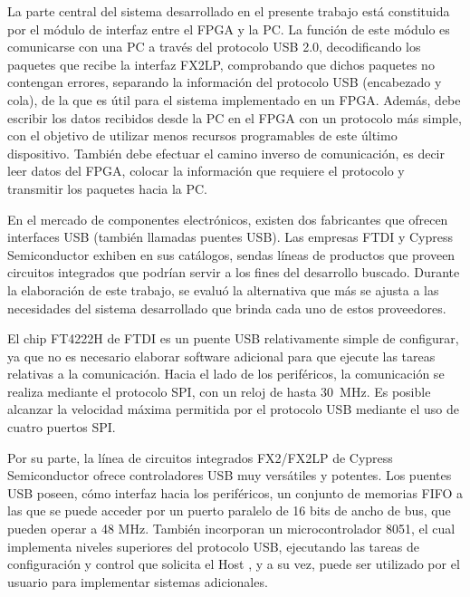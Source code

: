 La parte central del sistema desarrollado en el presente trabajo está constituida por el módulo de interfaz entre el FPGA y la PC. La función de este módulo es comunicarse con una PC a través del protocolo USB 2.0, decodificando los paquetes que recibe la interfaz FX2LP, comprobando que dichos paquetes no contengan errores, separando la información del protocolo USB (encabezado y cola), de la que es útil para el sistema implementado en un FPGA. Además, debe escribir los datos recibidos desde la PC en el FPGA con un protocolo más simple, con el objetivo de utilizar menos recursos programables de este último dispositivo. También debe efectuar el camino inverso de comunicación, es decir leer datos del FPGA, colocar la información que requiere el protocolo y transmitir los paquetes hacia la PC.%

En el mercado de componentes electrónicos, existen dos fabricantes que ofrecen interfaces USB (también llamadas puentes USB). Las empresas FTDI y Cypress Semiconductor exhiben en sus catálogos, sendas líneas de productos que proveen circuitos integrados que podrían servir a los fines del desarrollo buscado. Durante la elaboración de este trabajo, se evaluó la alternativa que más se ajusta a las necesidades del sistema desarrollado que brinda cada uno de estos proveedores.

El chip FT4222H de FTDI es un puente USB relativamente simple de configurar, ya que no es necesario elaborar software adicional para que ejecute las tareas relativas a la comunicación. Hacia el lado de los periféricos, la comunicación se realiza mediante el protocolo SPI, con un reloj de hasta \SI{30}{\mega\hertz}. Es posible alcanzar la velocidad máxima permitida por el protocolo USB mediante el uso de cuatro puertos SPI.%

Por su parte, la línea de circuitos integrados FX2/FX2LP de Cypress Semiconductor ofrece controladores USB muy versátiles y potentes. Los puentes USB poseen, cómo interfaz hacia los periféricos, un conjunto de memorias FIFO a las que se puede acceder por un puerto paralelo de 16 bits de ancho de bus, que pueden operar a 48 MHz. También incorporan un microcontrolador 8051, el cual implementa niveles superiores del protocolo USB, ejecutando las tareas de configuración y control que solicita el Host \cite{CypressSemiconductor2014fx2lp}, y a su vez, puede ser utilizado por el usuario para implementar sistemas adicionales.

